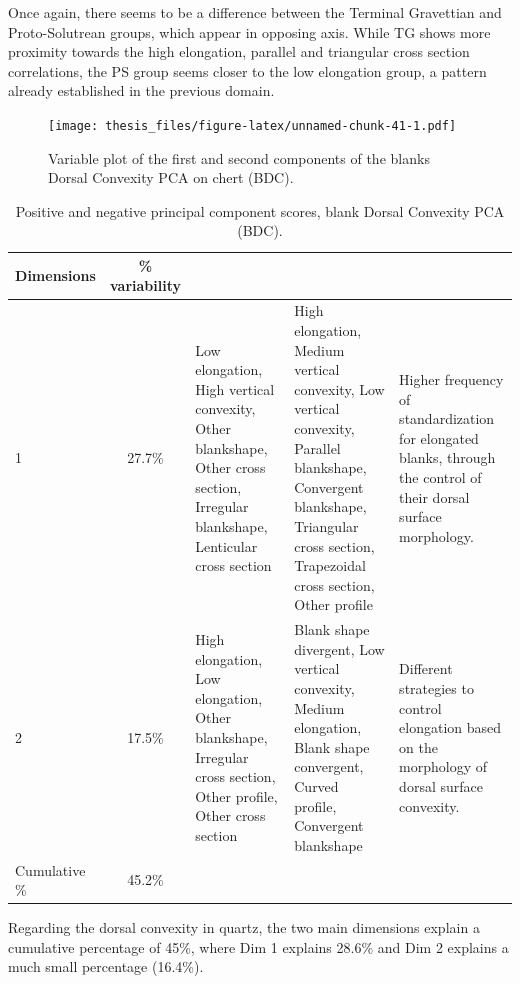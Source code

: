\documentclass[12pt,twoside]{reedthesis}
\begin{document}
Once again, there seems to be a difference between the Terminal Gravettian and Proto-Solutrean groups, which appear in opposing axis. While TG shows more proximity towards the high elongation, parallel and triangular cross section correlations, the PS group seems closer to the low elongation group, a pattern already established in the previous domain.
\begin{figure}
\centering
\texttt{[image: thesis\_files/figure-latex/unnamed-chunk-41-1.pdf]}
\caption{\label{fig:unnamed-chunk-41}Variable plot of the first and second components of the blanks Dorsal Convexity PCA on chert (BDC).}
\end{figure}
\begin{table}

\caption{\label{tab:unnamed-chunk-42}Positive and negative principal component scores, blank Dorsal Convexity PCA (BDC).}
\centering
\begin{tabular}[t]{lc>{\raggedright\arraybackslash}p{3cm}>{\raggedright\arraybackslash}p{3cm}>{\raggedright\arraybackslash}p{3cm}}
\toprule
\multicolumn{1}{c}{\textbf{Dimensions}} & \multicolumn{1}{c}{\textbf{\% variability}} & \multicolumn{1}{>{\centering\arraybackslash}p{3cm}}{\textbf{+}} & \multicolumn{1}{>{\centering\arraybackslash}p{3cm}}{\textbf{-}} & \multicolumn{1}{>{\centering\arraybackslash}p{3cm}}{\textbf{Interpretation}}\\
\midrule
1 & 27.7\% & Low elongation, High vertical convexity, Other blankshape, Other cross section, Irregular blankshape, Lenticular cross section & High elongation, Medium vertical convexity, Low vertical convexity, Parallel blankshape, Convergent blankshape, Triangular cross section, Trapezoidal cross section, Other profile & Higher frequency of standardization for elongated blanks, through the control of their dorsal surface morphology.\\
2 & 17.5\% & High elongation, Low elongation, Other blankshape, Irregular cross section, Other profile, Other cross section & Blank shape divergent, Low vertical convexity, Medium elongation, Blank shape convergent, Curved profile, Convergent blankshape & Different strategies to control elongation based on the morphology of dorsal surface convexity.\\
Cumulative \% & 45.2\% &  &  & \\
\bottomrule
\end{tabular}
\end{table}
Regarding the dorsal convexity in quartz, the two main dimensions explain a cumulative percentage of 45\%, where Dim 1 explains 28.6\% and Dim 2 explains a much small percentage (16.4\%).
\end{document}
